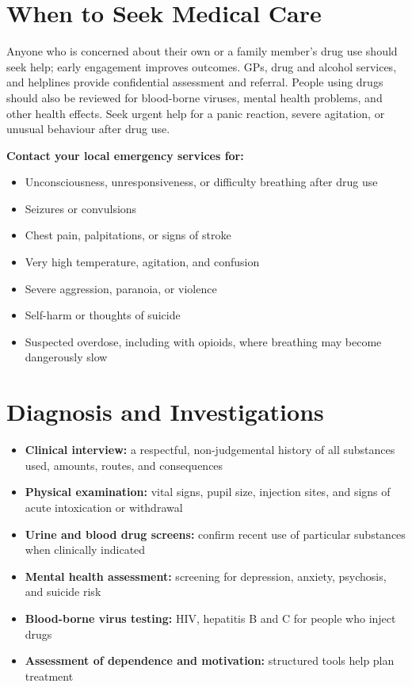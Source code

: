 \section*{When to Seek Medical Care}
Anyone who is concerned about their own or a family member's drug use should seek help; early engagement improves outcomes. GPs, drug and alcohol services, and helplines provide confidential assessment and referral. People using drugs should also be reviewed for blood-borne viruses, mental health problems, and other health effects. Seek urgent help for a panic reaction, severe agitation, or unusual behaviour after drug use.

\textbf{Contact your local emergency services for:}
\begin{itemize}
    \item Unconsciousness, unresponsiveness, or difficulty breathing after drug use
    \item Seizures or convulsions
    \item Chest pain, palpitations, or signs of stroke
    \item Very high temperature, agitation, and confusion
    \item Severe aggression, paranoia, or violence
    \item Self-harm or thoughts of suicide
    \item Suspected overdose, including with opioids, where breathing may become dangerously slow
\end{itemize}

\section*{Diagnosis and Investigations}
\begin{itemize}
    \item \textbf{Clinical interview:} a respectful, non-judgemental history of all substances used, amounts, routes, and consequences
    \item \textbf{Physical examination:} vital signs, pupil size, injection sites, and signs of acute intoxication or withdrawal
    \item \textbf{Urine and blood drug screens:} confirm recent use of particular substances when clinically indicated
    \item \textbf{Mental health assessment:} screening for depression, anxiety, psychosis, and suicide risk
    \item \textbf{Blood-borne virus testing:} HIV, hepatitis B and C for people who inject drugs
    \item \textbf{Assessment of dependence and motivation:} structured tools help plan treatment
\end{itemize}

